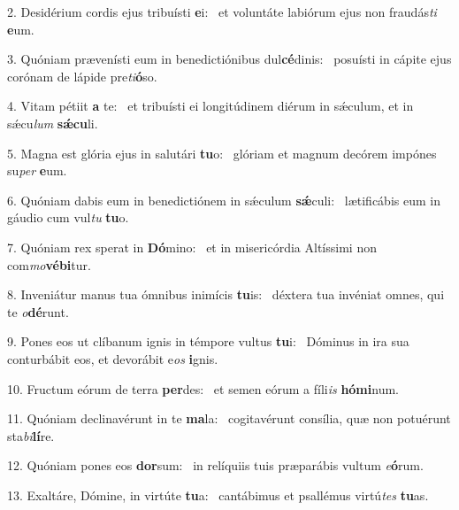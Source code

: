 2. Desidérium cordis ejus tribuísti \textbf{e}i: \ast\  et voluntáte labiórum ejus non fraudás\textit{ti} \textbf{e}um.\

3. Quóniam prævenísti eum in benedictiónibus dul\textbf{cé}dinis: \ast\  posuísti in cápite ejus corónam de lápide pre\textit{ti}\textbf{ó}so.\

4. Vitam pétiit \textbf{a} te: \ast\  et tribuísti ei longitúdinem diérum in sǽculum, et in sǽcu\textit{lum} \textbf{sǽ}\textbf{cu}li.\

5. Magna est glória ejus in salutári \textbf{tu}o: \ast\  glóriam et magnum decórem impónes su\textit{per} \textbf{e}um.\

6. Quóniam dabis eum in benedictiónem in sǽculum \textbf{sǽ}culi: \ast\  lætificábis eum in gáudio cum vul\textit{tu} \textbf{tu}o.\

7. Quóniam rex sperat in \textbf{Dó}mino: \ast\  et in misericórdia Altíssimi non com\textit{mo}\textbf{vé}\textbf{bi}tur.\

8. Inveniátur manus tua ómnibus inimícis \textbf{tu}is: \ast\  déxtera tua invéniat omnes, qui te \textit{o}\textbf{dé}runt.\

9. Pones eos ut clíbanum ignis in témpore vultus \textbf{tu}i: \ast\  Dóminus in ira sua conturbábit eos, et devorábit e\textit{os} \textbf{i}gnis.\

10. Fructum eórum de terra \textbf{per}des: \ast\  et semen eórum a fíli\textit{is} \textbf{hó}\textbf{mi}num.\

11. Quóniam declinavérunt in te \textbf{ma}la: \ast\  cogitavérunt consília, quæ non potuérunt sta\textit{bi}\textbf{lí}re.\

12. Quóniam pones eos \textbf{dor}sum: \ast\  in relíquiis tuis præparábis vultum \textit{e}\textbf{ó}rum.\

13. Exaltáre, Dómine, in virtúte \textbf{tu}a: \ast\  cantábimus et psallémus virtú\textit{tes} \textbf{tu}as.\

